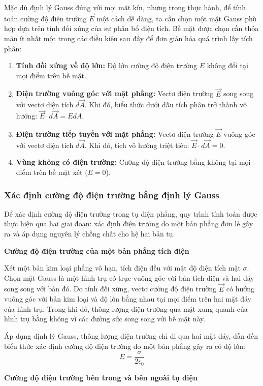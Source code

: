Mặc dù định lý Gauss đúng với mọi mặt kín, nhưng trong thực hành, để tính toán cường độ điện trường $\vec{E}$ một cách dễ dàng, ta cần chọn một mặt Gauss phù hợp dựa trên tính đối xứng của sự phân bố điện tích. Bề mặt được chọn cần thỏa mãn ít nhất một trong các điều kiện sau đây để đơn giản hóa quá trình lấy tích phân:
\begin{enumerate}
    \item \textbf{Tính đối xứng về độ lớn:} Độ lớn cường độ điện trường $E$ không đổi tại mọi điểm trên bề mặt.
    \item \textbf{Điện trường vuông góc với mặt phẳng:} Vectơ điện trường $\vec{E}$ song song với vectơ diện tích $d\vec{A}$. Khi đó, biểu thức dưới dấu tích phân trở thành vô hướng: $\vec{E} \cdot d\vec{A} = E dA$.
    \item \textbf{Điện trường tiếp tuyến với mặt phẳng:} Vectơ điện trường $\vec{E}$ vuông góc với vectơ diện tích $d\vec{A}$. Khi đó, tích vô hướng triệt tiêu: $\vec{E} \cdot d\vec{A} = 0$.
    \item \textbf{Vùng không có điện trường:} Cường độ điện trường bằng không tại mọi điểm trên bề mặt xét ($E = 0$).
\end{enumerate}


\subsubsection{Xác định cường độ điện trường bằng định lý Gauss}
Để xác định cường độ điện trường trong tụ điện phẳng, quy trình tính toán được thực hiện qua hai giai đoạn: xác định điện trường do một bản phẳng đơn lẻ gây ra và áp dụng nguyên lý chồng chất cho hệ hai bản tụ.

\textbf{Cường độ điện trường của một bản phẳng tích điện}
    
Xét một bản kim loại phẳng vô hạn, tích điện đều với mật độ điện tích mặt $\sigma$. Chọn mặt Gauss là một hình trụ có trục vuông góc với bản tích điện và hai đáy song song với bản đó. Do tính đối xứng, vectơ cường độ điện trường $\vec{E}$ có hướng vuông góc với bản kim loại và độ lớn bằng nhau tại mọi điểm trên hai mặt đáy của hình trụ. Trong khi đó, thông lượng điện trường qua mặt xung quanh của hình trụ bằng không vì các đường sức song song với bề mặt này.

Áp dụng định lý Gauss, thông lượng điện trường chỉ đi qua hai mặt đáy, dẫn đến biểu thức xác định cường độ điện trường do một bản phẳng gây ra có độ lớn:
$$E = \frac{\sigma}{2\epsilon_0}$$

\textbf{Cường độ điện trường bên trong và bên ngoài tụ điện}


